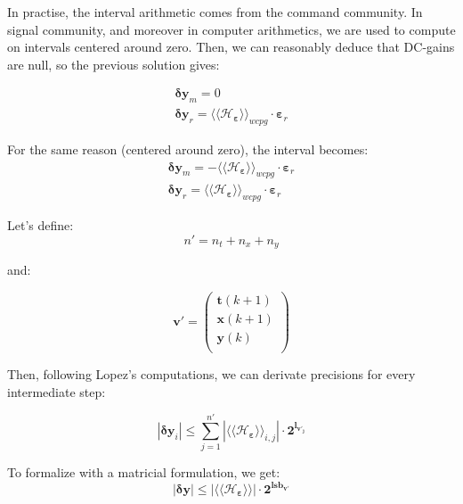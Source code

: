 		In practise, the interval arithmetic comes from the command community.
		In signal community, and moreover in computer arithmetics, we are used to compute on intervals centered around zero.
		Then, we can reasonably deduce that DC-gains are null, so the previous solution gives:

		\begin{eqnarray} \label{eqprec}
			\boldsymbol{\delta y}_m = 0 \\
			\boldsymbol{\delta y}_r = \langle\langle \mathcal{H}_{\boldsymbol{\varepsilon}} \rangle\rangle_{wcpg} \cdot \boldsymbol{\varepsilon}_r
		\end{eqnarray}

		For the same reason (centered around zero), the interval becomes:
		\begin{eqnarray} \label{eqprec}
			\boldsymbol{\delta y}_m = -\langle\langle \mathcal{H}_{\boldsymbol{\varepsilon}} \rangle\rangle_{wcpg} \cdot \boldsymbol{\varepsilon}_r \\
			\boldsymbol{\delta y}_r = \langle\langle \mathcal{H}_{\boldsymbol{\varepsilon}} \rangle\rangle_{wcpg} \cdot \boldsymbol{\varepsilon}_r
		\end{eqnarray}

		Let's define:
			$$n'=n_t+n_x+n_y$$

		and:

			\begin{equation}
				\boldsymbol{v'}=
				\begin{pmatrix}
					\boldsymbol{t}(k+1) \\
					\boldsymbol{x}(k+1) \\
					\boldsymbol{y}(k)   \\
				\end{pmatrix}
			\end{equation}


		Then, following Lopez's computations, we can derivate precisions for every intermediate step:
		
		\begin{equation}
			|\boldsymbol{\delta y}_i| \leq \sum_{j=1}^{n'} | \langle\langle \mathcal{H}_{\boldsymbol{\varepsilon}} \rangle\rangle_{i,j}| \cdot \boldsymbol{2^{l_{v'_j}}}
		\end{equation}

		To formalize with a matricial formulation, we get:
		\begin{equation}
			|\boldsymbol{\delta y}| \leq | \langle\langle \mathcal{H}_{\boldsymbol{\varepsilon}} \rangle\rangle| \cdot \boldsymbol{2^{lsb_{v'}}}
		\end{equation}


